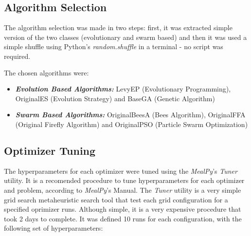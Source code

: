 \documentclass[conference]{IEEEtran}
\begin{document}
\subsection{Algorithm Selection}
\label{subsec:methodology-algorithm-selection}

The algorithm selection was made in two steps: first, it was extracted simple version of the two classes (evolutionary and swarm based) and
then it was used a simple shuffle using Python's \textit{random.shuffle} in a terminal - no script was required.

The chosen algorithms were:

\begin{itemize}
    \item \textit{\textbf{Evolution Based Algorithms: }} LevyEP (Evolutionary Programming),
    OriginalES (Evolution Strategy) and BaseGA (Genetic Algorithm)
    \item \textit{\textbf{Swarm Based Algorithms: }} OriginalBeesA (Bees Algorithm),
    OriginalFFA (Original Firefly Algorithm) and OriginalPSO (Particle Swarm Optimization)
\end{itemize}

\subsection{Optimizer Tuning}
\label{subsec:methodology-optimizer-tuning}

The hyperparameters for each optimizer were tuned using the \textit{MealPy}'s \textit{Tuner} utility.
It is a recomended procedure to tune hyperparameters for each optimizer and problem, according to
\textit{MealPy}'s Manual.
The \textit{Tuner} utility is a very simple grid search metaheuristic search tool
that test each grid configuration for a specified oprimizer runs.
Although simple, it is a very expensive procedure that took 2 days to complete. It was defined 10 runs for each
configuration, with the following set of hyperparameters:
\end{document}
